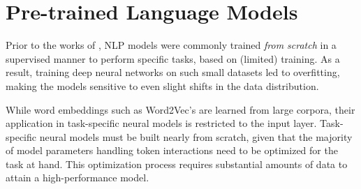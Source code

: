 \chapter{Pre-trained Language Models}
\label{chapter:related-pretrained-language-models}


\renewcommand{\leftmark}{\spacedlowsmallcaps{Pre-trained Language Models}}


\minitoc



Prior to the works of \citet{peters-etal-2018-deep}, \ac{NLP} models were commonly trained \textit{from scratch} in a supervised manner to perform specific tasks, based on (limited) training. As a result, training deep neural networks on such small datasets led to overfitting, making the models sensitive to even slight shifts in the data distribution. 

While word embeddings such as Word2Vec's \citep{mikolov2013efficient} are learned from large corpora, their application in task-specific neural models is restricted to the input layer. Task-specific neural models must be built nearly from scratch, given that the majority of model parameters handling token interactions need to be optimized for the task at hand. This optimization process requires substantial amounts of data to attain a high-performance model.


